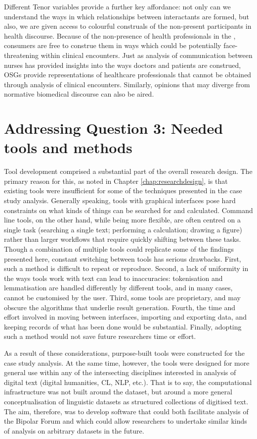 Different Tenor variables provide a further key affordance: not only can we understand the ways in which relationships between interactants are formed, but also, we are given access to colourful construals of the non-present participants in health discourse. Because of the non-presence of health professionals in the , consumers are free to construe them in ways which could be potentially face\hyp{}threatening within clinical encounters. Just as analysis of communication between nurses has provided insights into the ways doctors and patients are construed, \glspl{OSG} provide representations of healthcare professionals that cannot be obtained through analysis of clinical encounters. Similarly, opinions that may diverge from normative biomedical discourse can also be aired.

\section{Addressing Question 3: Needed tools and methods}

Tool development comprised a substantial part of the overall research design. The primary reason for this, as noted in Chapter \ref{chap:researchdesign}, is that existing tools were insufficient for some of the techniques presented in the case study analysis. Generally speaking, tools with graphical interfaces pose hard constraints on what kinds of things can be searched for and calculated. Command line tools, on the other hand, while being more flexible, are often centred on a single task (searching a single text; performing a calculation; drawing a figure) rather than larger workflows that require quickly shifting between these tasks. Though a combination of multiple tools could replicate some of the findings presented here, constant switching between tools has serious drawbacks. First, such a method is difficult to repeat or reproduce. Second, a lack of uniformity in the ways tools work with text can lead to inaccuracies: tokenisation and lemmatisation are handled differently by different tools, and in many cases, cannot be customised by the user. Third, some tools are proprietary, and may obscure the algorithms that underlie result generation. Fourth, the time and effort involved in moving between interfaces, importing and exporting data, and keeping records of what has been done would be substantial. Finally, adopting such a method would not save future researchers time or effort.

As a result of these considerations, purpose-built tools were constructed for the case study analysis. At the same time, however, the tools were designed for more general use within any of the intersecting disciplines interested in analysis of digital text (digital humanities, \gls{CL}, \gls{NLP}, etc.). That is to say, the computational infrastructure was not built around the dataset, but around a more general conceptualisation of linguistic datasets as structured collections of digitised text. The aim, therefore, was to develop software that could both facilitate analysis of the Bipolar Forum and which could allow researchers to undertake similar kinds of analysis on arbitrary datasets in the future.

